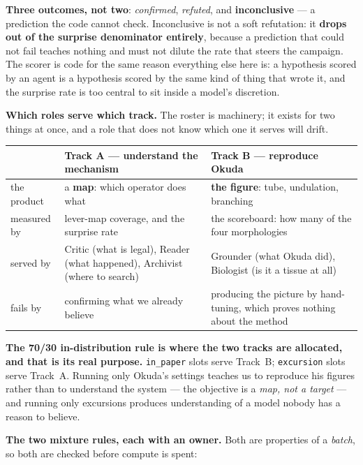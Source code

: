 \documentclass[11pt,a4paper]{article}
\newcommand{\code}[1]{\texttt{#1}}
\begin{document}
\textbf{Three outcomes, not two}: \emph{confirmed}, \emph{refuted}, and \textbf{inconclusive} --- a
prediction the code cannot check. Inconclusive is not a soft refutation: it \textbf{drops out of
the surprise denominator entirely}, because a prediction that could not fail teaches nothing and
must not dilute the rate that steers the campaign. The scorer is code for the same reason
everything else here is: a hypothesis scored by an agent is a hypothesis scored by the same kind of
thing that wrote it, and the surprise rate is too central to sit inside a model's discretion.

\vspace{4pt}
\textbf{Which roles serve which track.} The roster is machinery; it exists for two things at once,
and a role that does not know which one it serves will drift.

\begin{center}\small
\begin{tabular}{@{}l p{5.5cm} p{5.5cm}@{}}
\toprule
& \textbf{Track A --- understand the mechanism} & \textbf{Track B --- reproduce Okuda}\\
\midrule
the product & a \textbf{map}: which operator does what & \textbf{the figure}: tube, undulation,
branching\\
measured by & lever-map coverage, and the surprise rate & the scoreboard: how many of the four
morphologies\\
served by & Critic (what is legal), Reader (what happened), Archivist (where to search) &
Grounder (what Okuda did), Biologist (is it a tissue at all)\\
fails by & confirming what we already believe & producing the picture by hand-tuning, which proves
nothing about the method\\
\bottomrule
\end{tabular}
\end{center}

\textbf{The 70/30 in-distribution rule is where the two tracks are allocated, and that is its real
purpose.} \code{in\_paper} slots serve Track~B; \code{excursion} slots serve Track~A. Running only
Okuda's settings teaches us to reproduce his figures rather than to understand the system --- the
objective is a \emph{map, not a target} --- and running only excursions produces understanding of a
model nobody has a reason to believe.

\vspace{4pt}
\textbf{The two mixture rules, each with an owner.} Both are properties of a \emph{batch}, so both
are checked before compute is spent:
\end{document}
